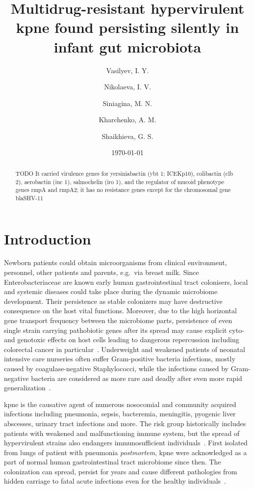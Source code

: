 \documentclass[12pt,a4paper]{article}
\author[1]{Vasilyev, I. Y.} %
\author[2]{Nikolaeva, I. V.}  %
\author[1]{Siniagina, M. N.}  %
\author[1]{Kharchenko, A. M.}  %
\author[2]{Shaikhieva, G. S.}  %
\affil[1]{Institute of Fundamental Medicine and Biology, Kazan Federal University, Kazan, Russia}
\affil[2]{Kazan State Medical University, Kazan, Russia}
\title{Multidrug-resistant hypervirulent \Gls{kpne} found persisting silently in infant gut microbiota}
\date{\today}
\begin{document}
\maketitle
\glsresetall

\begin{abstract}
TODO
  It carried virulence genes for yersiniabactin (ybt 1; ICEKp10), colibactin (clb 2), aerobactin (iuc 1), salmochelin (iro 1), and the regulator of mucoid phenotype genes rmpA and rmpA2; it has no resistance genes except for the chromosomal gene blaSHV-11

\end{abstract}

\section{Introduction}\label{sec:intro}
Newborn patients could obtain microorganisms from clinical environment, personnel, other patients and parents,
e.g.\ via breast milk.
Since Enterobacteriaceae are known early human gastrointestinal tract colonisers, local and systemic diseases could take
place during the dynamic microbiome development.
Their persistence as stable colonizers may have destructive consequence on the host vital functions.
Moreover, due to the high horizontal gene transport frequency between the microbiome parts, persistence of even single
strain carrying pathobiotic genes after its spread may cause explicit cyto- and genotoxic effects on host cells
leading to dangerous repercussion including colorectal cancer in particular~\cite{Pope2019}.
Underweight and weakened patients of neonatal intensive care nurseries often suffer Gram-positive bacteria infections,
mostly caused by coagulase-negative Staphylococci, while the infections caused by Gram-negative bacteria are considered
as more rare and deadly after even more rapid generalization~\cite{Dorota2017}.

\gls{kpne} is the causative agent of numerous nosocomial and community acquired infections including
pneumonia, sepsis, bacteremia, meningitis, pyogenic liver abscesses, urinary tract infections and more.
The risk group historically includes patients with weakened and malfunctioning immune system, but the spread of
hypervirulent strains also endangers immunosufficient individuals~\cite{Shankar2018}.
First isolated from lungs of patient with pneumonia \textit{postmortem}, \gls{kpne} were acknowledged as a part of
normal human gastrointestinal tract microbiome since then.
The colonization can spread, persist for years and cause different pathologies from hidden carriage to
fatal acute infections even for the healthy individuals~\cite{Martin2018}.
\end{document}
